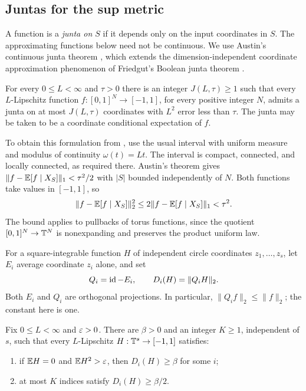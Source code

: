 \subsection{Juntas for the sup metric}

A function is a \emph{junta on $S$} if it depends only on the input
coordinates in $S$. The approximating functions below need not be continuous.
We use Austin's continuous junta theorem \cite{Austin2016}, which
extends the dimension-independent coordinate approximation phenomenon
of Friedgut's Boolean junta theorem \cite{Friedgut1998}.

\begin{theorem}
\label{thm:junta}
For every $0\le L<\infty$ and $\tau>0$ there is an integer $J(L,\tau)\ge1$
such that every $L$-Lipschitz function
$f:[0,1]^N\to[-1,1]$, for every positive integer $N$, admits a junta
on at most $J(L,\tau)$ coordinates with $L^2$ error less than $\tau$.
The junta may be taken to be a coordinate conditional expectation of $f$.
\end{theorem}

To obtain this formulation from
\cite[Theorem~1.1, arXiv version~4]{Austin2016},
use the usual interval with uniform measure and modulus of continuity
$\omega(t)=Lt$. The interval is compact, connected, and locally connected,
as required there. Austin's theorem gives
$\|f-\mathbb E[f\mid X_S]\|_1<\tau^2/2$ with $|S|$ bounded independently of $N$.
Both functions take values in $[-1,1]$, so
\[
 \|f-\mathbb E[f\mid X_S]\|_2^2
 \le 2\|f-\mathbb E[f\mid X_S]\|_1<\tau^2.
\]
The bound applies to pullbacks of torus functions, since the quotient
$[0,1]^N\to\mathbb T^N$ is nonexpanding and preserves the product uniform law.

For a square-integrable function $H$ of independent circle coordinates
$z_1,\ldots,z_s$, let $E_i$ average coordinate $z_i$ alone, and set
\[
 Q_i=\operatorname{id}-E_i,\qquad D_i(H)=\|Q_iH\|_2.
\]
Both $E_i$ and $Q_i$ are orthogonal projections. In particular,
$\|Q_if\|_2\le\|f\|_2$; the constant here is one.

\begin{lemma}\label{lem:influences}
Fix $0\le L<\infty$ and $\varepsilon>0$. There are $\beta>0$ and an integer $K\ge1$,
independent of $s$, such that every $L$-Lipschitz
$H:\mathbb T^s\to[-1,1]$ satisfies:
\begin{enumerate}[label=\textup{(\roman*)}]
\item if $\mathbb E H=0$ and $\mathbb E H^2>\varepsilon$, then $D_i(H)\ge\beta$ for some $i$;
\item at most $K$ indices satisfy $D_i(H)\ge\beta/2$.
\end{enumerate}
\end{lemma}

